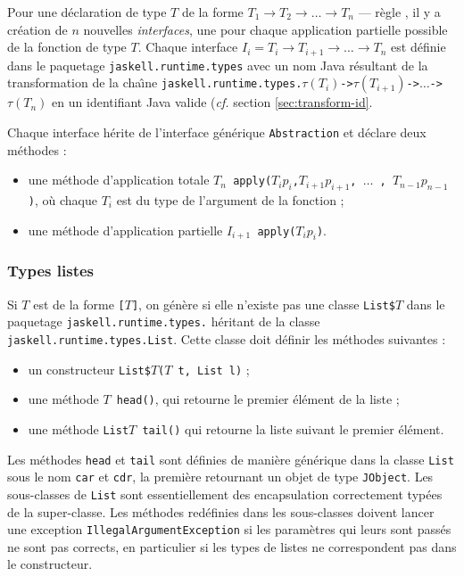 Pour une d\'eclaration de type $T$ de la forme  $T_1 \rightarrow T_2 \rightarrow \dots
\rightarrow T_n$ --- r\`egle , il y a cr\'eation de $n$ nouvelles \emph{interfaces}, une
pour chaque application partielle possible de la fonction de type
$T$. Chaque interface $I_i = T_i \rightarrow T_{i+1} \rightarrow \dots
\rightarrow T_n$ est d\'efinie dans le paquetage
\verb+jaskell.runtime.types+ avec un nom Java r\'esultant de la
transformation de la cha\^{\i}ne
\texttt{jaskell.runtime.types.}$\tau(T_i)$\texttt{->}$\tau(T_{i+1})$\texttt{->}$\dots$\texttt{->}$\tau(T_{n})$
en un identifiant Java valide (\emph{cf.} section
\ref{sec:transform-id}. 

Chaque interface h\'erite de l'interface g\'en\'erique \texttt{Abstraction}
et d\'eclare deux m\'ethodes :
\begin{itemize}
  \item une m\'ethode d'application totale \texttt{$T_n$ apply($T_i p_i$,$T_{i+1}
    p_{i+1}$, $\dots$ , $T_{n-1} p_{n-1}$)}, o\`u chaque $T_i$ est du
  type de l'argument de la fonction ;
\item une m\'ethode d'application partielle \texttt{$I_{i+1}$ apply($T_i
    p_i$)}.
\end{itemize}

\subsubsection{Types listes}

Si $T$ est de la forme \texttt{[}$T$\texttt{]}, on g\'en\`ere si elle
n'existe pas une classe \texttt{List\$$T$} dans le paquetage
\texttt{jaskell.runtime.types.} h\'eritant de la classe
\texttt{jaskell.runtime.types.List}. Cette classe doit d\'efinir les m\'ethodes
suivantes :
\begin{itemize}
  \item un constructeur \texttt{List\$$T$($T$ t, List l)} ;
  \item une m\'ethode \texttt{$T$ head()}, qui retourne le premier
    \'el\'ement de la liste ;
  \item une m\'ethode \texttt{List$T$ tail()} qui retourne la liste suivant
    le premier \'el\'ement.
\end{itemize}

Les m\'ethodes \texttt{head} et \texttt{tail} sont d\'efinies de mani\`ere
g\'en\'erique dans la classe \texttt{List}  sous le nom \texttt{car} et
\texttt{cdr}, la premi\`ere retournant un objet de type
\texttt{JObject}. Les sous-classes de \texttt{List} sont essentiellement
des encapsulation correctement typ\'ees de la super-classe. Les m\'ethodes
red\'efinies dans les sous-classes doivent lancer une exception
\texttt{IllegalArgumentException} si les param\`etres qui leurs sont
pass\'es ne sont pas corrects, en particulier si les types de listes ne
correspondent pas dans le constructeur.

